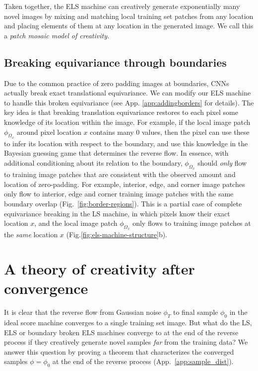 \documentclass{article}
\theoremstyle{plain}
\theoremstyle{definition}
\theoremstyle{remark}
\begin{document}
Taken together, the ELS machine can creatively generate exponentially many novel images by mixing and matching local training set patches from any location and placing elements of them at any location in the generated image.  We call this a {\it patch mosaic model of creativity.} 




\subsection{Breaking equivariance through boundaries}\label{sec:borders}


Due to the common practice of zero padding images at boundaries, CNNs actually break exact translational equivariance.  We can modify our ELS machine to handle this broken equivariance (see App. \ref{app:addingborders} for details).  The key idea is that breaking translation equivariance restores to each pixel some knowledge of its location within the image.  For example, if the local image patch $\phi_{\Omega_x}$ around pixel location $x$ contains many $0$ values, then the pixel can use these to infer its location with respect to the boundary, and use this knowledge in the Bayesian guessing game that determines the reverse flow. In essence, with additional conditioning about its relation to the boundary, $\phi_{\Omega_x}$ should {\it only} flow to training image patches that are consistent with the observed amount and location of zero-padding. For example, interior, edge, and corner image patches only flow to interior, edge and corner training image patches with the same boundary overlap (Fig.~\ref{fig:border-regions}).  This is a partial case of complete equivariance breaking in the LS machine, in which pixels know their exact location $x$, and the local image patch $\phi_{\Omega_x}$ only flows to training image patches at the {\it same} location $x$ (Fig.\ref{fig:els-machine-structure}b).  





\section{A theory of creativity after convergence}
\label{sec:creativitytheory}

It is clear that the reverse flow from Gaussian noise $\phi_T$ to final sample $\phi_0$ in the ideal score machine converges to a single training set image.  But what do the LS, ELS or boundary broken ELS machines converge to at the end of the reverse process if they creatively generate novel samples {\it far} from the training data? We answer this question by proving a theorem that characterizes the converged samples $\phi=\phi_0$ at the end of the reverse process (App.~\ref{app:sample_dist}).
\end{document}
